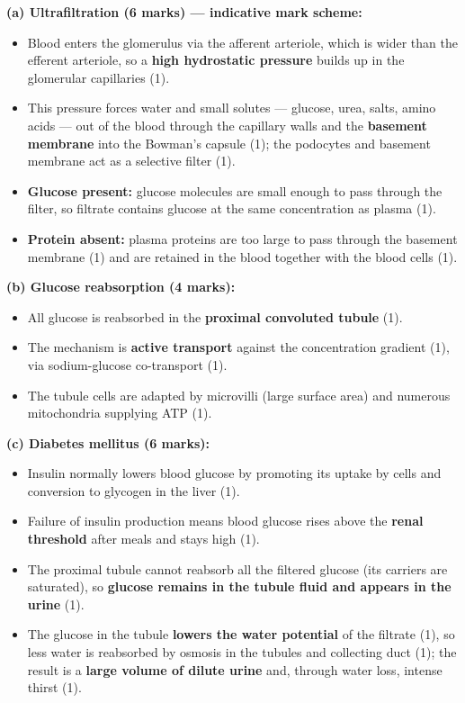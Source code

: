\documentclass[11pt]{article}
\begin{document}
\begin{corrige}
\textbf{(a) Ultrafiltration (6 marks) — indicative mark scheme:}
\begin{itemize}
\item Blood enters the glomerulus via the afferent arteriole, which is wider than the efferent arteriole, so a \textbf{high hydrostatic pressure} builds up in the glomerular capillaries (1).
\item This pressure forces water and small solutes — glucose, urea, salts, amino acids — out of the blood through the capillary walls and the \textbf{basement membrane} into the Bowman's capsule (1); the podocytes and basement membrane act as a selective filter (1).
\item \textbf{Glucose present:} glucose molecules are small enough to pass through the filter, so filtrate contains glucose at the same concentration as plasma (1).
\item \textbf{Protein absent:} plasma proteins are too large to pass through the basement membrane (1) and are retained in the blood together with the blood cells (1).
\end{itemize}
\textbf{(b) Glucose reabsorption (4 marks):}
\begin{itemize}
\item All glucose is reabsorbed in the \textbf{proximal convoluted tubule} (1).
\item The mechanism is \textbf{active transport} against the concentration gradient (1), via sodium-glucose co-transport (1).
\item The tubule cells are adapted by microvilli (large surface area) and numerous mitochondria supplying ATP (1).
\end{itemize}
\textbf{(c) Diabetes mellitus (6 marks):}
\begin{itemize}
\item Insulin normally lowers blood glucose by promoting its uptake by cells and conversion to glycogen in the liver (1).
\item Failure of insulin production means blood glucose rises above the \textbf{renal threshold} after meals and stays high (1).
\item The proximal tubule cannot reabsorb all the filtered glucose (its carriers are saturated), so \textbf{glucose remains in the tubule fluid and appears in the urine} (1).
\item The glucose in the tubule \textbf{lowers the water potential} of the filtrate (1), so less water is reabsorbed by osmosis in the tubules and collecting duct (1); the result is a \textbf{large volume of dilute urine} and, through water loss, intense thirst (1).

\end{itemize}
\end{corrige}
\end{document}
